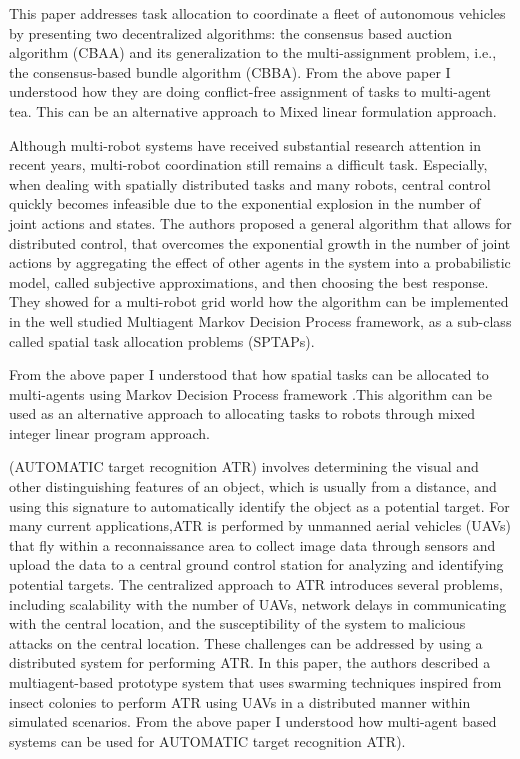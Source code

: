 \documentclass[conference]{IEEEtran}
\begin{document}
This paper addresses task allocation to coordinate a fleet of autonomous vehicles by presenting two decentralized algorithms: the consensus based auction algorithm (CBAA) and its generalization to the multi-assignment problem, i.e., the consensus-based bundle algorithm (CBBA)\cite{choi2009consensus}.
From the above paper I understood how they are doing conflict-free assignment of tasks to multi-agent tea. This can be an alternative approach to Mixed linear formulation approach.

Although multi-robot systems have received substantial research attention in recent years, multi-robot coordination
still remains a difficult task. Especially, when dealing with spatially distributed tasks and many robots, central control quickly becomes infeasible due to the exponential explosion in the number of joint actions and states. The authors proposed a general algorithm that allows for distributed control, that overcomes the exponential growth in the number of joint actions by aggregating the effect of other agents in the system into a probabilistic model, called subjective approximations, and then choosing the best response. They showed for a multi-robot grid world how the algorithm can be implemented in the well studied Multiagent Markov Decision Process framework, as a sub-class called spatial task allocation problems (SPTAPs)\cite{claes2015effective}.

From the above paper I understood that how spatial tasks can be allocated to multi-agents using Markov Decision Process framework .This algorithm can be used as an alternative approach to allocating tasks to robots through mixed integer linear program approach.

(AUTOMATIC target recognition ATR) involves determining the visual and other distinguishing features of an object, which is usually from a distance, and using this signature to automatically identify the object as a potential target. For many current applications,ATR is performed by unmanned aerial vehicles (UAVs) that fly within a reconnaissance area to collect image data through sensors and upload the data to a central ground control station for analyzing and identifying potential targets. The centralized approach to ATR introduces several problems, including scalability with the number of UAVs, network delays in communicating with the central location, and the susceptibility of the system to malicious attacks on the central location. These challenges can be addressed by using a distributed system for performing ATR\cite{dasgupta2008multiagent}.
In this paper, the authors described a multiagent-based prototype system that uses swarming techniques inspired from insect colonies to perform ATR using UAVs in a distributed manner within simulated scenarios.
From the above paper I understood how multi-agent based systems can be used for AUTOMATIC target recognition ATR).
\end{document}
